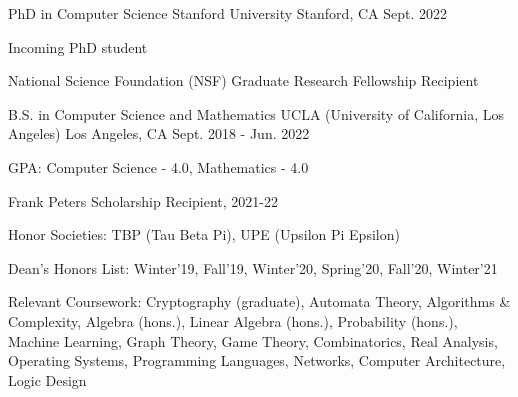 

\begin{cventries}

\cventry
    {PhD in Computer Science} %
    {Stanford University} %
    {Stanford, CA} %
    {Sept. 2022} %
    {
      \begin{cvitems} %
        \item {Incoming PhD student}
        \item {National Science Foundation (NSF) Graduate Research Fellowship Recipient}
      \end{cvitems}
    }

  \cventry
    {B.S. in Computer Science and Mathematics} %
    {UCLA (University of California, Los Angeles)} %
    {Los Angeles, CA} %
    {Sept. 2018 - Jun. 2022} %
    {
      \begin{cvitems} %
        \item {GPA: Computer Science - 4.0, Mathematics - 4.0}
        \item {Frank Peters Scholarship Recipient, 2021-22}
        \item{Honor Societies: TBP (Tau Beta Pi), UPE (Upsilon Pi Epsilon)}
        \item {Dean's Honors List: Winter'19, Fall'19, Winter'20, Spring'20, Fall'20, Winter'21}
        \item {Relevant Coursework: Cryptography (graduate), Automata Theory, Algorithms \& Complexity, Algebra (hons.), Linear Algebra (hons.), Probability (hons.), Machine Learning, Graph Theory, Game Theory, Combinatorics, Real Analysis, Operating Systems, Programming Languages, Networks, Computer Architecture, Logic Design}
      \end{cvitems}
    }

\end{cventries}
